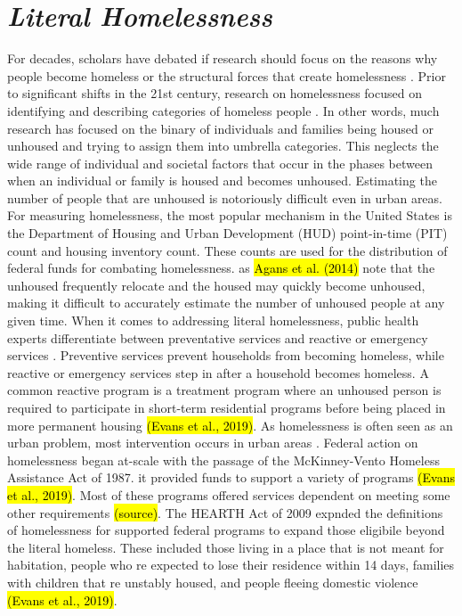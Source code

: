 \section{\textit{Literal Homelessness}}
For decades, scholars have debated if research should focus on the reasons why people become homeless or the structural forces that create homelessness \citep{shlay_social_2003}. Prior to significant shifts in the 21st century, research on homelessness focused on identifying and describing categories of homeless people \citep{lee_homelessness_2021}. In other words, much research has focused on the binary of individuals and families being housed or unhoused and trying to assign them into umbrella categories. This neglects the wide range of individual and societal factors that occur in the phases between when an individual or family is housed and becomes unhoused. Estimating the number of people that are unhoused is notoriously difficult even in urban areas. For measuring homelessness, the most popular mechanism in the United States is the Department of Housing and Urban Development (HUD) point-in-time (PIT) count and housing inventory count. These counts are used for the distribution of federal funds for combating homelessness. as \hl{Agans et al. (2014)} note that the unhoused frequently relocate and the housed may quickly become unhoused, making it difficult to accurately estimate the number of unhoused people at any given time. When it comes to addressing literal homelessness, public health experts differentiate between preventative services and reactive or emergency services \citep{oregan_how_2021}. Preventive services prevent households from becoming homeless, while reactive or emergency services step in after a household becomes homeless. A common reactive program is a treatment program where an unhoused person is required to participate in short-term residential programs before being placed in more permanent housing \hl{(Evans et al., 2019)}. As homelessness is often seen as an urban problem, most intervention occurs in urban areas \citep{gleason_using_2021}. Federal action on homelessness began at-scale with the passage of the McKinney-Vento Homeless Assistance Act of 1987. it provided funds to support a variety of programs \hl{(Evans et al., 2019)}. Most of these programs offered services dependent on meeting some other requirements \hl{(source)}. The HEARTH Act of 2009 expnded the definitions of homelessness for supported federal programs to expand those eligibile beyond the literal homeless. These included those living in a place that is not meant for habitation, people who re expected to lose their residence within 14 days, families with children that re unstably housed, and people fleeing domestic violence \hl{(Evans et al., 2019)}. 

